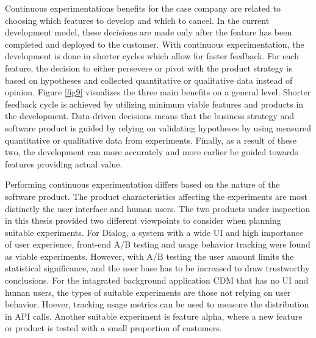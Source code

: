 \documentclass[english]{tktltiki2}
\theoremstyle{definition}
\theoremstyle{remark}
\begin{document}


Continuous experimentations benefits for the case company are related to choosing which features to develop and which to cancel. In the current development model, these decisions are made only after the feature has been completed and deployed to the customer. With continuous experimentation, the development is done in shorter cycles which allow for faster feedback. For each feature, the decision to either persevere or pivot with the product strategy is based on hypotheses and collected quantitative or qualitative data instead of opinion. Figure \ref{fig9} visualizes the three main benefits on a general level. Shorter feedback cycle is achieved by utilizing minimum viable features and products in the development. Data-driven decisions means that the business strategy and software product is guided by relying on validating hypotheses by using measured quantitative or qualitative data from experiments. Finally, as a result of these two, the development can more accurately and more earlier be guided towards features providing actual value.


Performing continuous experimentation differs based on the nature of the software product. The product characteristics affecting the experiments are most distinctly the user interface and human users. The two products under inspection in this thesis provided two different viewpoints to consider when planning suitable experiments. For Dialog, a system with a wide UI and high importance of user experience, front-end A/B testing and usage behavior tracking were found as viable experiments. However, with A/B testing the user amount limits the statistical significance, and the user base has to be increased to draw trustworthy conclusions. For the intagrated background application CDM that has no UI and human users, the types of suitable experiments are those not relying on user behavior. Hoever, tracking usage metrics can be used to measure the distribution in API calls. Another suitable experiment is feature alpha, where a new feature or product is tested with a small proportion of customers.
\end{document}
